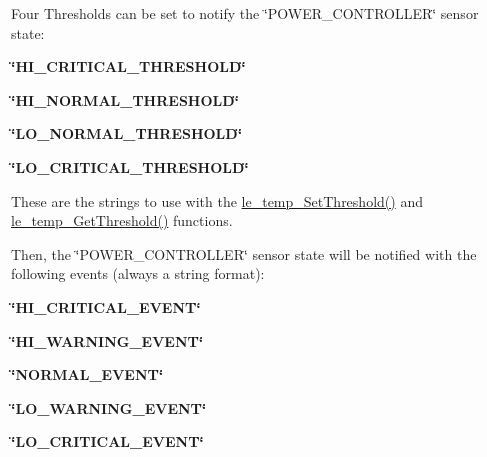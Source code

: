 Four Thresholds can be set to notify the \char`\"{}\+P\+O\+W\+E\+R\+\_\+\+C\+O\+N\+T\+R\+O\+L\+L\+E\+R\char`\"{} sensor state\+:
\begin{DoxyItemize}
\item {\bfseries \char`\"{}\+H\+I\+\_\+\+C\+R\+I\+T\+I\+C\+A\+L\+\_\+\+T\+H\+R\+E\+S\+H\+O\+L\+D\char`\"{}} 
\item {\bfseries \char`\"{}\+H\+I\+\_\+\+N\+O\+R\+M\+A\+L\+\_\+\+T\+H\+R\+E\+S\+H\+O\+L\+D\char`\"{}} 
\item {\bfseries \char`\"{}\+L\+O\+\_\+\+N\+O\+R\+M\+A\+L\+\_\+\+T\+H\+R\+E\+S\+H\+O\+L\+D\char`\"{}} 
\item {\bfseries \char`\"{}\+L\+O\+\_\+\+C\+R\+I\+T\+I\+C\+A\+L\+\_\+\+T\+H\+R\+E\+S\+H\+O\+L\+D\char`\"{}} 
\end{DoxyItemize}

These are the strings to use with the \hyperlink{le__temp__interface_8h_a9e21aa40ec65dda6976d0e5fc7b2aec4}{le\+\_\+temp\+\_\+\+Set\+Threshold()} and \hyperlink{le__temp__interface_8h_ac53124401d9333a14d62f938fc640272}{le\+\_\+temp\+\_\+\+Get\+Threshold()} functions.

Then, the \char`\"{}\+P\+O\+W\+E\+R\+\_\+\+C\+O\+N\+T\+R\+O\+L\+L\+E\+R\char`\"{} sensor state will be notified with the following events (always a string format)\+:
\begin{DoxyItemize}
\item {\bfseries \char`\"{}\+H\+I\+\_\+\+C\+R\+I\+T\+I\+C\+A\+L\+\_\+\+E\+V\+E\+N\+T\char`\"{}} 
\item {\bfseries \char`\"{}\+H\+I\+\_\+\+W\+A\+R\+N\+I\+N\+G\+\_\+\+E\+V\+E\+N\+T\char`\"{}} 
\item {\bfseries \char`\"{}\+N\+O\+R\+M\+A\+L\+\_\+\+E\+V\+E\+N\+T\char`\"{}} 
\item {\bfseries \char`\"{}\+L\+O\+\_\+\+W\+A\+R\+N\+I\+N\+G\+\_\+\+E\+V\+E\+N\+T\char`\"{}} 
\item {\bfseries \char`\"{}\+L\+O\+\_\+\+C\+R\+I\+T\+I\+C\+A\+L\+\_\+\+E\+V\+E\+N\+T\char`\"{}} 
\end{DoxyItemize}

